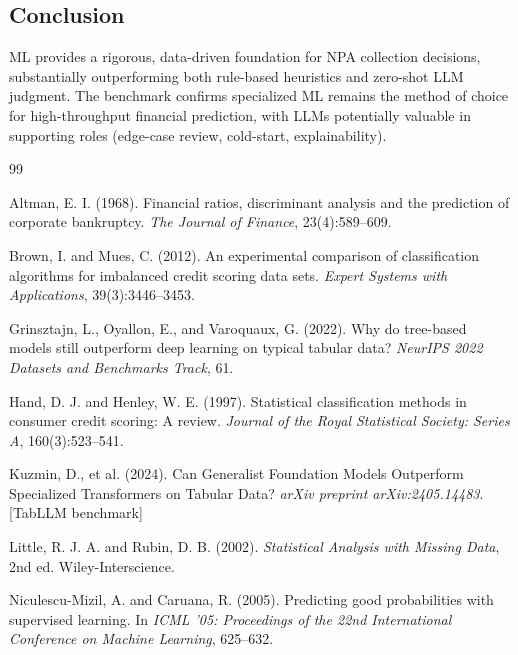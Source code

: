 \documentclass[12pt, a4paper]{article}
\begin{document}
\subsection{Conclusion}

ML provides a rigorous, data-driven foundation for NPA collection decisions, substantially outperforming both rule-based heuristics and zero-shot LLM judgment. The benchmark confirms specialized ML remains the method of choice for high-throughput financial prediction, with LLMs potentially valuable in supporting roles (edge-case review, cold-start, explainability).


\newpage

\begin{thebibliography}{99}

Altman, E. I. (1968).
\newblock Financial ratios, discriminant analysis and the prediction of corporate bankruptcy.
\newblock \emph{The Journal of Finance}, 23(4):589--609.

Brown, I. and Mues, C. (2012).
\newblock An experimental comparison of classification algorithms for imbalanced credit scoring data sets.
\newblock \emph{Expert Systems with Applications}, 39(3):3446--3453.

Grinsztajn, L., Oyallon, E., and Varoquaux, G. (2022).
\newblock Why do tree-based models still outperform deep learning on typical tabular data?
\newblock \emph{NeurIPS 2022 Datasets and Benchmarks Track}, 61.

Hand, D. J. and Henley, W. E. (1997).
\newblock Statistical classification methods in consumer credit scoring: A review.
\newblock \emph{Journal of the Royal Statistical Society: Series A}, 160(3):523--541.

Kuzmin, D., et al. (2024).
\newblock Can Generalist Foundation Models Outperform Specialized Transformers on Tabular Data?
\newblock \emph{arXiv preprint arXiv:2405.14483}. [TabLLM benchmark]

Little, R. J. A. and Rubin, D. B. (2002).
\newblock \emph{Statistical Analysis with Missing Data}, 2nd ed.
\newblock Wiley-Interscience.

Niculescu-Mizil, A. and Caruana, R. (2005).
\newblock Predicting good probabilities with supervised learning.
\newblock In \emph{ICML '05: Proceedings of the 22nd International Conference on Machine Learning}, 625--632.


\end{thebibliography}
\end{document}
